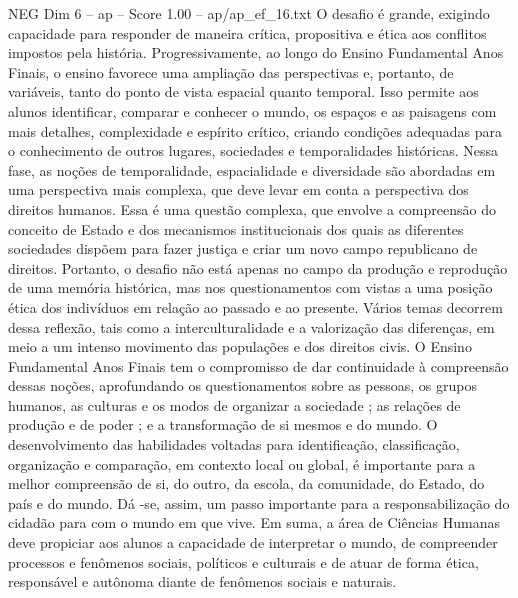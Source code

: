 \begin{textsample}{NEG Dim 6 – ap – Score 1.00 – ap/ap\_ef\_16.txt}
O desafio é grande, exigindo capacidade para responder de maneira crítica, propositiva e ética aos conflitos impostos pela história.
Progressivamente, ao longo do Ensino Fundamental Anos Finais, o ensino favorece uma ampliação das perspectivas e, portanto, de variáveis, tanto do ponto de vista espacial quanto temporal.
Isso permite aos alunos identificar, comparar e conhecer o mundo, os espaços e as paisagens com mais detalhes, complexidade e espírito crítico, criando condições adequadas para o conhecimento de outros lugares, sociedades e temporalidades históricas.
Nessa fase, as noções de temporalidade, espacialidade e diversidade são abordadas em uma perspectiva mais complexa, que deve levar em conta a perspectiva dos direitos humanos.
Essa é uma questão complexa, que envolve a compreensão do conceito de Estado e dos mecanismos institucionais dos quais as diferentes sociedades dispõem para fazer justiça e criar um novo campo republicano de direitos.
Portanto, o desafio não está apenas no campo da produção e reprodução de uma memória histórica, mas nos questionamentos com vistas a uma posição ética dos indivíduos em relação ao passado e ao presente.
Vários temas decorrem dessa reflexão, tais como a interculturalidade e a valorização das diferenças, em meio a um intenso movimento das populações e dos direitos civis.
O Ensino Fundamental Anos Finais tem o compromisso de dar continuidade à compreensão dessas noções, aprofundando os questionamentos sobre as pessoas, os grupos humanos, as culturas e os modos de organizar a sociedade ; as relações de produção e de poder ; e a transformação de si mesmos e do mundo.
O desenvolvimento das habilidades voltadas para identificação, classificação, organização e comparação, em contexto local ou global, é importante para a melhor compreensão de si, do outro, da escola, da comunidade, do Estado, do país e do mundo.
Dá -se, assim, um passo importante para a responsabilização do cidadão para com o mundo em que vive.
Em suma, a área de Ciências Humanas deve propiciar aos alunos a capacidade de interpretar o mundo, de compreender processos e fenômenos sociais, políticos e culturais e de atuar de forma ética, responsável e autônoma diante de fenômenos sociais e naturais.

\end{textsample}
